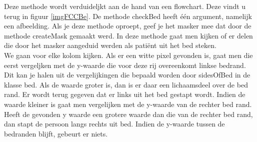 Deze methode wordt verduideljkt aan de hand van een flowchart. Deze vindt u terug in figuur \ref{imgFCCBe}. De methode checkBed heeft \'e\'en argument, namelijk een afbeelding. Als je deze methode oproept, geef je het masker mee dat door de methode createMask gemaakt werd. In deze methode gaat men kijken of er delen die door het masker aangeduid werden als pati\"ent uit het bed steken. \\
We gaan voor elke kolom kijken. Als er een witte pixel gevonden is, gaat men die eerst vergeljken met de y-waarde die voor deze rij overeenkomt linkse bedrand. Dit kan je halen uit de vergelijkingen die bepaald worden door sidesOfBed in de klasse bed. Als de waarde groter is, dan is er daar een lichaamsdeel over de bed rand. Er wordt terug gegeven dat er links uit het bed gestapt wordt. Indien de waarde kleiner is gaat men vergelijken met de y-waarde van de rechter bed rand. Heeft de gevonden y waarde een grotere waarde dan die van de rechter bed rand, dan stapt de persoon langs rechts uit bed. Indien de y-waarde tussen de bedranden blijft, gebeurt er niets.

